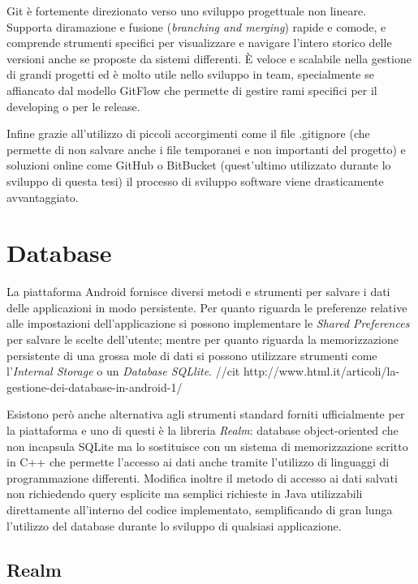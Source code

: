 Git è fortemente direzionato verso uno sviluppo progettuale non lineare.
Supporta diramazione e fusione (\textit{branching and merging}) rapide
e comode, e comprende strumenti specifici per visualizzare e navigare
l'intero storico delle versioni anche se proposte da sistemi differenti.
È veloce e scalabile nella gestione di grandi progetti ed è molto
utile nello sviluppo in team, specialmente se affiancato dal modello
GitFlow che permette di gestire rami specifici per il developing o
per le release.

Infine grazie all'utilizzo di piccoli accorgimenti come il file .gitignore
(che permette di non salvare anche i file temporanei e non importanti
del progetto) e soluzioni online come GitHub o BitBucket (quest'ultimo
utilizzato durante lo sviluppo di questa tesi) il processo di sviluppo
software viene drasticamente avvantaggiato.

\section{Database}

La piattaforma Android fornisce diversi metodi e strumenti per salvare
i dati delle applicazioni in modo persistente. Per quanto riguarda
le preferenze relative alle impostazioni dell'applicazione si possono
implementare le \emph{Shared Preferences }per salvare le scelte dell’utente;
mentre per quanto riguarda la memorizzazione persistente di una grossa
mole di dati si possono utilizzare strumenti come l'\emph{Internal
Storage} o un \emph{Database SQLlite}. //cit http://www.html.it/articoli/la-gestione-dei-database-in-android-1/

Esistono però anche alternativa agli strumenti standard forniti ufficialmente
per la piattaforma e uno di questi è la libreria \emph{Realm}: database
object-oriented che non incapsula SQLite ma lo sostituisce con un
sistema di memorizzazione scritto in C++ che permette l'accesso ai
dati anche tramite l'utilizzo di linguaggi di programmazione differenti.
Modifica inoltre il metodo di accesso ai dati salvati non richiedendo
query esplicite ma semplici richieste in Java utilizzabili direttamente
all'interno del codice implementato, semplificando di gran lunga l'utilizzo
del database durante lo sviluppo di qualsiasi applicazione.

\subsection{Realm}

